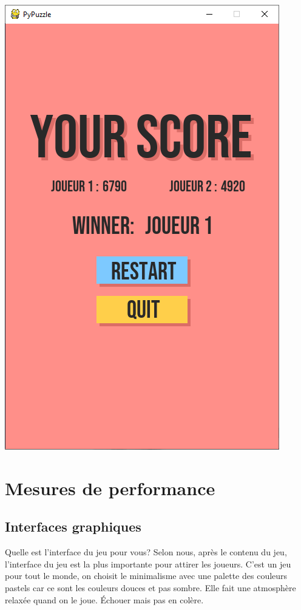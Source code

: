 \documentclass[a4paper]{report}
\begin{document}
\begin{enumerate}
        \includegraphics[scale=0.3]{images/4-endmulti.png}
\end{enumerate}


\section{Mesures de performance}

\subsection{Interfaces graphiques} 
Quelle est l'interface du jeu pour vous? Selon nous, après le contenu du jeu, l'interface du jeu est la plus importante pour attirer les joueurs.
C'est un jeu pour tout le monde, on choisit le minimalisme avec
une palette des couleurs pastels car ce sont les couleurs douces et pas sombre. 
Elle fait une atmosphère relaxée quand on le joue. Échouer mais pas en colère.\\
\end{document}
